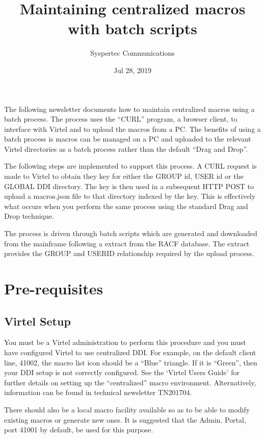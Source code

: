 \documentclass[letterpaper,10pt,english]{sphinxmanual}
\title{Maintaining centralized macros with batch scripts}
\date{Jul 28, 2019}
\author{Syspertec Communications}
\begin{document}
\pagestyle{empty}
\sphinxmaketitle
\pagestyle{plain}
\sphinxtableofcontents
\pagestyle{normal}
\label{\detokenize{TN201903::doc}}


The following newsletter documents how to maintain centralized macros using a batch process. The process uses the “CURL” program, a browser client, to interface with Virtel and to upload the macros from a PC. The benefits of using a batch process is macros can be managed on a PC and uploaded to the relevant Virtel directories as a batch process rather than the default “Drag and Drop”.

The following steps are implemented to support this process. A CURL request is made to Virtel to obtain they key for either the GROUP id, USER id or the GLOBAL DDI directory. The key is then used in a subsequent HTTP POST to upload a macros.json file to that directory indexed by the key. This is effectively what occurs when you perform the same process using the standard Drag and Drop technique.

The process is driven through batch scripts which are generated and downloaded from the mainframe following a extract from the RACF database. The extract provides the GROUP and USERID relationship required by the upload process.


\chapter{Pre-requisites}
\label{\detokenize{TN201903:pre-requisites}}

\section{Virtel Setup}
\label{\detokenize{TN201903:virtel-setup}}
You must be a Virtel administration to perform this procedure and you must have configured Virtel to use centralized DDI. For example, on the default client line, 41002, the macro list icon should be a “Blue” triangle. If it is “Green”, then your DDI setup is not correctly configured. See the ‘Virtel Users Guide’ for further details on setting up the “centralized” macro environment. Alternatively, information can be found in technical newsletter TN201704.

There should also be a local macro facility available so as to be able to modify existing macros or generate new ones. It is suggested that the Admin. Portal, port 41001 by default, be used for this purpose.
\end{document}
